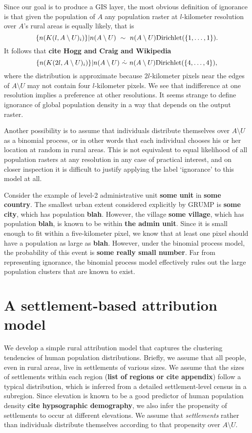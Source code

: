 \documentclass[a4paper]{article}
\begin{document}
\bigskip
Since our goal is to produce a GIS layer, the most obvious definition of ignorance is that given the population of $A$ any population raster at $l$-kilometer resolution over $A$'s rural areas is equally likely, that is
\begin{equation}
	\{n(K(l,A\setminus U)_i)\}|n(A\setminus U)\ \sim\ n(A\setminus U)\textup {Dirichlet}(\{1,\ldots,1\}).
\end{equation}
It follows that \textbf{cite Hogg and Craig and Wikipedia}
\begin{equation}
	\{n(K(2l,A\setminus U)_i)\}|n(A\setminus U)\ \dot\sim\ n(A\setminus U)\textup {Dirichlet}(\{4,\ldots,4\}),
\end{equation}
where the distribution is approximate because $2l$-kilometer pixels near the edges of $A\setminus U$ may not contain four $l$-kilometer pixels. We see that indifference at one resolution implies a preference at other resolutions. It seems strange to define ignorance of global population density in a way that depends on the output raster.

\bigskip
Another possibility is to assume that individuals distribute themselves over $A\setminus U$ as a binomial process, or in other words that each individual chooses his or her location at random in rural areas. This is not equivalent to equal likelihood of all population rasters at any resolution in any case of practical interest, and on closer inspection it is difficult to justify applying the label `ignorance' to this model at all. 

Consider the example of level-2 administrative unit \textbf{some unit} in \textbf{some country}. The smallest urban extent considered explicitly by GRUMP is \textbf{some city}, which has population \textbf{blah}. However, the village \textbf{some village}, which has population \textbf{blah}, is known to be within \textbf{the admin unit}. Since it is small enough to fit within a five-kilometer pixel, we know that at least one pixel should have a population as large as \textbf{blah}. However, under the binomial process model, the probability of this event is \textbf{some really small number}. Far from representing ignorance, the binomial process model effectively rules out the large population clusters that are known to exist.

\section{A settlement-based attribution model}
We develop a simple rural attribution model that captures the clustering tendencies of human population distributions. Briefly, we assume that all people, even in rural areas, live in settlements of various sizes. We assume that the sizes of settlements within each region (\textbf{list of regions or cite appendix}) follow a typical distribution, which is inferred from a detailed settlement-level census in a subregion. Since elevation is known to be a good predictor of human population density \textbf{cite hypsographic demography}, we also infer the propensity of settlements to occur at different elevations. We assume that \emph{settlements} rather than individuals distribute themselves according to that propensity over $A\setminus U$.
\end{document}
